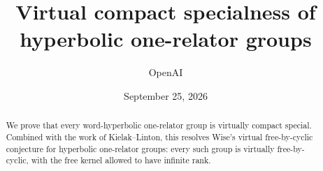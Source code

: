 \documentclass[11pt]{article}
\title{Virtual compact specialness of hyperbolic one-relator groups}
\author{OpenAI}
\date{September 25, 2026}
\numberwithin{equation}{section}
\theoremstyle{definition}
\theoremstyle{remark}
\begin{document}
\maketitle
\begin{abstract}
We prove that every word-hyperbolic one-relator group is virtually compact
special. Combined with the work of Kielak--Linton, this resolves Wise's
virtual free-by-cyclic conjecture for hyperbolic one-relator groups: every
such group is virtually free-by-cyclic, with the free kernel allowed to have
infinite rank.
\end{abstract}

\tableofcontents













\end{document}
